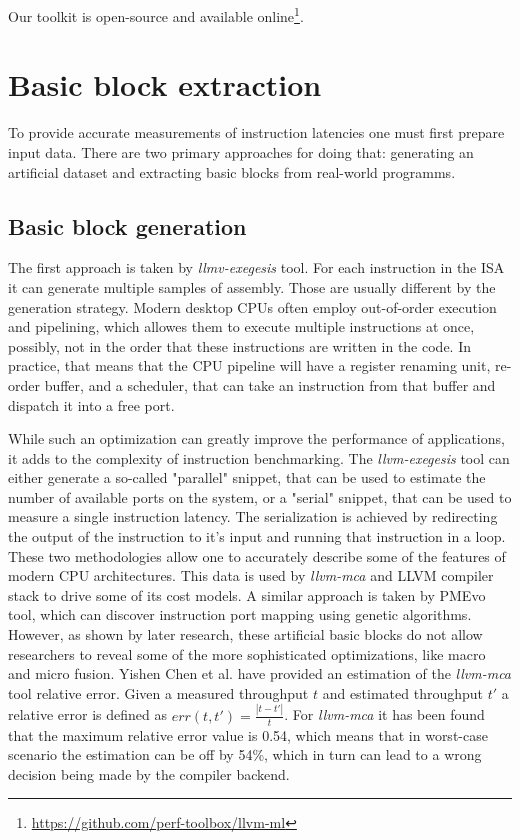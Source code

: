 Our toolkit is open-source and available online\footnote{\url{https://github.com/perf-toolbox/llvm-ml}}.

\section{Basic block extraction}

To provide accurate measurements of instruction latencies one must first prepare input data. There are 
two primary approaches for doing that: generating an artificial dataset and extracting basic blocks from
real-world programms.

\subsection{Basic block generation}

The first approach is taken by \textit{llmv-exegesis} tool. For each instruction in the ISA it can 
generate multiple samples of assembly. Those are usually different by the generation strategy. 
Modern desktop CPUs often employ out-of-order execution and pipelining, which allowes them to execute 
multiple instructions at once, possibly, not in the order that these instructions are written in the 
code. In practice, that means that the CPU pipeline will have a register renaming unit, re-order buffer, 
and a scheduler, that can take an instruction from that buffer and dispatch it into a free port.

While such an optimization can greatly improve the performance of applications, it adds to the complexity 
of instruction benchmarking. The \textit{llvm-exegesis} tool can either generate a so-called "parallel" snippet, 
that can be used to estimate the number of available ports on the system, or a "serial" snippet, 
that can be used to measure a single instruction latency. The serialization is achieved by redirecting 
the output of the instruction to it's input and running that instruction in a loop. These two 
methodologies allow one to accurately describe some of the features of modern CPU architectures. 
This data is used by \textit{llvm-mca} and LLVM compiler stack to drive some of its cost models. 
A similar approach is taken by PMEvo tool, which can discover instruction port mapping using genetic 
algorithms\cite{ritterPMEvoPortableInference2020}. However, as shown by later research, these artificial 
basic blocks do not allow researchers to reveal some of the more sophisticated optimizations, like macro 
and micro fusion. Yishen Chen et al.\cite{chenBHiveBenchmarkSuite2019} have provided an estimation of 
the \textit{llvm-mca} tool relative error. Given a measured throughput $t$ and estimated throughput $t'$ a 
relative error is defined as $err(t, t') = \frac{|t - t'|}{t}$. For \textit{llvm-mca} it has been found 
that the maximum relative error value is 0.54, which means that in worst-case scenario the estimation can
be off by 54\%, which in turn can lead to a wrong decision being made by the compiler backend.

